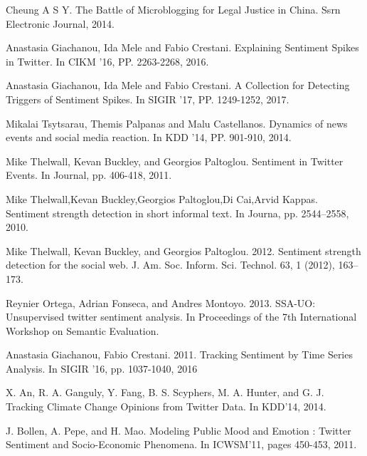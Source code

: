 \documentclass[runningheads]{llncs}
\begin{document}
\begin{thebibliography}{8}
Cheung A S Y. 
\newblock The Battle of Microblogging for Legal Justice in China. 
\newblock Ssrn Electronic Journal, 2014.

Anastasia Giachanou, Ida Mele and Fabio Crestani.
\newblock  Explaining Sentiment Spikes in Twitter.
\newblock In CIKM ’16, PP. 2263-2268, 2016.

Anastasia Giachanou, Ida Mele and Fabio Crestani.
\newblock  A Collection for Detecting Triggers of Sentiment Spikes.
\newblock In SIGIR ’17, PP. 1249-1252, 2017.

Mikalai Tsytsarau, Themis Palpanas and Malu Castellanos.
\newblock  Dynamics of news events and social media reaction.
\newblock In KDD ’14, PP. 901-910, 2014.

Mike Thelwall, Kevan Buckley, and Georgios Paltoglou.
\newblock Sentiment in Twitter Events.
\newblock In Journal, pp. 406-418, 2011.

Mike Thelwall,Kevan Buckley,Georgios Paltoglou,Di Cai,Arvid Kappas.
\newblock Sentiment strength detection in short informal text.
\newblock In Journa, pp. 2544–2558, 2010.

Mike Thelwall, Kevan Buckley, and Georgios Paltoglou. 2012.
\newblock Sentiment strength detection for the social web.
\newblock J. Am. Soc. Inform. Sci. Technol. 63, 1 (2012), 163–173.

Reynier Ortega, Adrian Fonseca, and Andres Montoyo. 2013.
\newblock SSA-UO: Unsupervised twitter sentiment analysis.
\newblock In Proceedings of the 7th International Workshop on Semantic Evaluation.

Anastasia Giachanou, Fabio Crestani. 2011.
\newblock Tracking Sentiment by Time Series Analysis.
\newblock In SIGIR ’16, pp. 1037-1040, 2016

X. An, R. A. Ganguly, Y. Fang, B. S. Scyphers, M. A. Hunter, and G. J.
\newblock Tracking Climate Change Opinions from Twitter Data. 
\newblock In KDD’14, 2014.

J. Bollen, A. Pepe, and H. Mao.
\newblock Modeling Public Mood and Emotion : Twitter Sentiment and Socio-Economic Phenomena. 
\newblock In ICWSM’11, pages 450-453, 2011.


\end{thebibliography}
\end{document}
